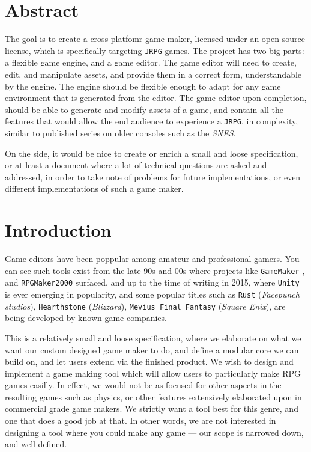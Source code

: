 \section{Abstract}

The goal is to create a cross platfomr game maker, licensed under an open source
license, which is specifically targeting \texttt{JRPG} games.  The project has
two big parts: a flexible game engine, and a game editor. The game editor will
need to create, edit, and manipulate assets, and provide them in a correct form,
understandable by the engine. The engine should be flexible enough to adapt for
any game environment that is generated from the editor. The game editor upon
completion, should be able to generate and modify assets of a game, and contain
all the features that would allow the end audience to experience a
\texttt{JRPG}, in complexity, similar to published series on older consoles such
as the \textit{SNES}.

On the side, it would be nice to create or enrich a small and loose
specification, or at least a document where a lot of technical questions are
asked and addressed, in order to take note of problems for future
implementations, or even different implementations of such a game maker.

\section{Introduction}

Game editors have been poppular among amateur and professional gamers. You can
see such tools exist from the late 90s and 00s where projects like
\texttt{GameMaker} \cite{gamemaker}, and \texttt{RPGMaker2000}
\cite{rpgmaker2000} surfaced, and up to the time of writing in 2015, where
\texttt{Unity} is ever emerging in popularity, and some popular titles such as
\texttt{Rust} (\textit{Facepunch studios}), \texttt{Hearthstone}
(\textit{Blizzard}), \texttt{Mevius Final Fantasy} (\textit{Square Enix}), are
being developed by known game companies.

This is a relatively small and loose specification, where we elaborate on what
we want our custom designed game maker to do, and define a modular core we can
build on, and let users extend via the finished product. We wish to design and
implement a game making tool which will allow users to particularly make RPG
games easilly. In effect, we would not be as focused for other aspects in the
resulting games such as physics, or other features extensively elaborated upon
in commercial grade game makers. We strictly want a tool best for this genre,
and one that does a good job at that. In other words, we are not interested in
designing a tool where you could make any game --- our scope is narrowed down,
and well defined.

